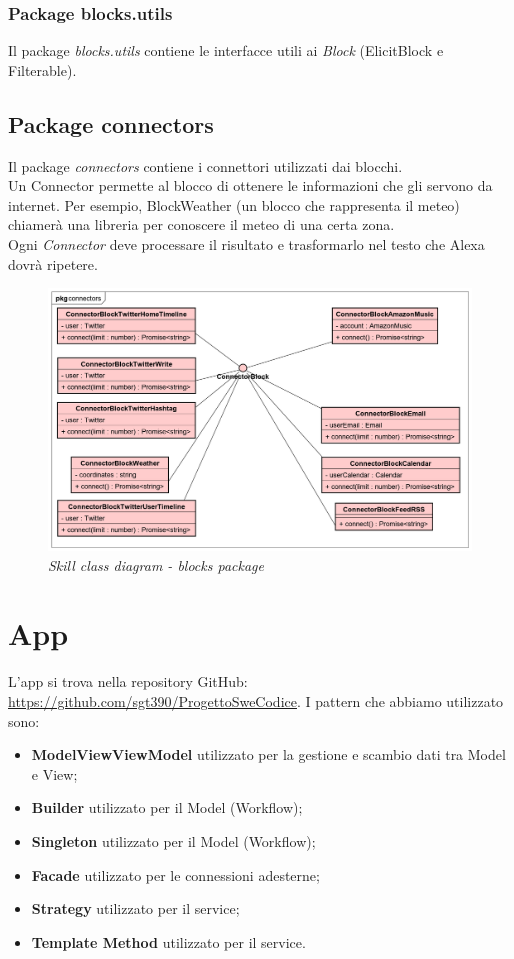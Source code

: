 \subsubsection{Package blocks.utils}
Il package \textit{blocks.utils} contiene le interfacce utili ai \textit{Block} (ElicitBlock e Filterable).
\subsection{Package connectors}
Il package \textit{connectors} contiene i connettori utilizzati dai blocchi.\\
Un Connector permette al blocco di ottenere le informazioni che gli servono da internet. Per esempio, BlockWeather (un blocco che rappresenta il meteo) chiamerà una libreria per conoscere il meteo di una certa zona.\\
Ogni \textit{Connector} deve processare il risultato e trasformarlo nel testo che Alexa dovrà ripetere.
\begin{figure} [H]
    \centering
	\includegraphics[scale=0.3]{./images/ZeroSevenClassConnectors.png}
	\caption{\textit{Skill class diagram - blocks package}}\label{classlambda}
\end{figure}

\newpage
\section{App}\label{architetturaApp}

L'app si trova nella repository GitHub: \url{https://github.com/sgt390/ProgettoSweCodice}.
I pattern che abbiamo utilizzato sono:
\begin{itemize}
	\item \textbf{ModelViewViewModel} utilizzato per la gestione e scambio dati tra Model e View;
	\item \textbf{Builder} utilizzato per il Model (Workflow);
	\item \textbf{Singleton} utilizzato per il Model (Workflow);
	\item \textbf{Facade} utilizzato per le connessioni adesterne;
	\item \textbf{Strategy} utilizzato per il service;
	\item \textbf{Template Method} utilizzato per il service.
\end{itemize}
\clearpage

